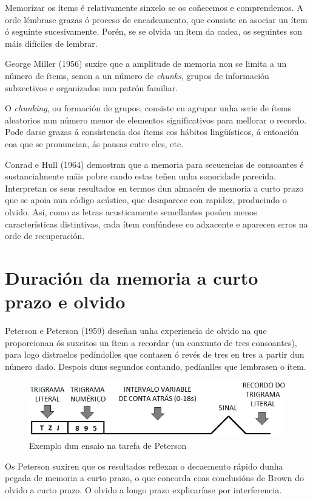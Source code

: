 \documentclass[a4paper,11pt]{article}
\begin{document}
Memorizar os ítems é relativamente sinxelo se os coñecemos e comprendemos. A orde lémbrase grazas ó proceso de encadeamento, que consiste en asociar un ítem ó seguinte sucesivamente. Porén, se se olvida un ítem da cadea, os seguintes son máis difíciles de lembrar. 

George Miller (1956) suxire que a amplitude de memoria non se limita a un número de ítems, senon a un número de \textit{chunks}, grupos de información subxectivos e organizados nun patrón familiar. 

O \textit{chunking}, ou formación de grupos, consiste en agrupar unha serie de ítems aleatorios nun número menor de elementos significativos para mellorar o recordo. Pode darse grazas á consistencia dos ítems cos hábitos lingüísticos, á entoación coa que se pronuncian, ás pausas entre eles, etc.

Conrad e Hull (1964) demostran que a memoria para secuencias de consoantes é sustancialmente máis pobre cando estas teñen unha sonoridade parecida. Interpretan os seus resultados en termos dun almacén de memoria a curto prazo que se apoia nun código acústico, que desaparece con rapidez, producindo o olvido. Así, como as letras acusticamente semellantes posúen menos características distintivas, cada ítem confúndese co adxacente e aparecen erros na orde de recuperación.

\section{Duración da memoria a curto prazo e olvido}
Peterson e Peterson (1959) deseñan unha experiencia de olvido na que proporcionan ós suxeitos un ítem a recordar (un conxunto de tres consoantes), para logo distraelos pedíndolles que contasen ó revés de tres en tres a partir dun número dado. Despois duns segundos contando, pedíanlles que lembrasen o ítem. 

\begin{figure}[h!]
	\centering
	\includegraphics[width=0.55\linewidth]{memoria2_1}
	\caption{Exemplo dun ensaio na tarefa de Peterson}
\end{figure}

Os Peterson suxiren que os resultados reflexan o decaemento rápido dunha pegada de memoria a curto prazo, o que concorda coas conclusións de Brown do olvido a curto prazo. O olvido a longo prazo explicaríase por interferencia. 
\end{document}
